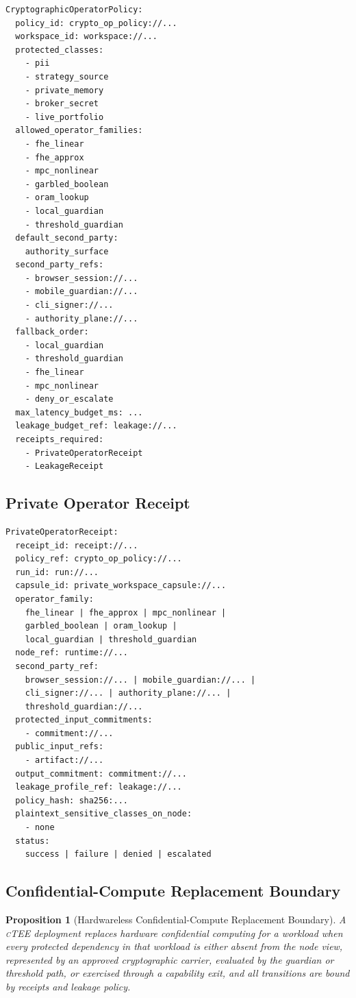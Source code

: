 \documentclass[11pt]{article}
\newtheorem{proposition}{Proposition}
\newcommand{\ctee}{\textnormal{\textsc{cTEE}}}
\begin{document}
\begin{Verbatim}[fontsize=\small]
CryptographicOperatorPolicy:
  policy_id: crypto_op_policy://...
  workspace_id: workspace://...
  protected_classes:
    - pii
    - strategy_source
    - private_memory
    - broker_secret
    - live_portfolio
  allowed_operator_families:
    - fhe_linear
    - fhe_approx
    - mpc_nonlinear
    - garbled_boolean
    - oram_lookup
    - local_guardian
    - threshold_guardian
  default_second_party:
    authority_surface
  second_party_refs:
    - browser_session://...
    - mobile_guardian://...
    - cli_signer://...
    - authority_plane://...
  fallback_order:
    - local_guardian
    - threshold_guardian
    - fhe_linear
    - mpc_nonlinear
    - deny_or_escalate
  max_latency_budget_ms: ...
  leakage_budget_ref: leakage://...
  receipts_required:
    - PrivateOperatorReceipt
    - LeakageReceipt
\end{Verbatim}

\subsection{Private Operator Receipt}

\begin{Verbatim}[fontsize=\small]
PrivateOperatorReceipt:
  receipt_id: receipt://...
  policy_ref: crypto_op_policy://...
  run_id: run://...
  capsule_id: private_workspace_capsule://...
  operator_family:
    fhe_linear | fhe_approx | mpc_nonlinear |
    garbled_boolean | oram_lookup |
    local_guardian | threshold_guardian
  node_ref: runtime://...
  second_party_ref:
    browser_session://... | mobile_guardian://... |
    cli_signer://... | authority_plane://... |
    threshold_guardian://...
  protected_input_commitments:
    - commitment://...
  public_input_refs:
    - artifact://...
  output_commitment: commitment://...
  leakage_profile_ref: leakage://...
  policy_hash: sha256:...
  plaintext_sensitive_classes_on_node:
    - none
  status:
    success | failure | denied | escalated
\end{Verbatim}

\subsection{Confidential-Compute Replacement Boundary}

\begin{proposition}[Hardwareless Confidential-Compute Replacement Boundary]
A \ctee{} deployment replaces hardware confidential computing for a workload
when every protected dependency in that workload is either absent from the
node view, represented by an approved cryptographic carrier, evaluated by the
guardian or threshold path, or exercised through a capability exit, and all
transitions are bound by receipts and leakage policy.
\end{proposition}
\end{document}
